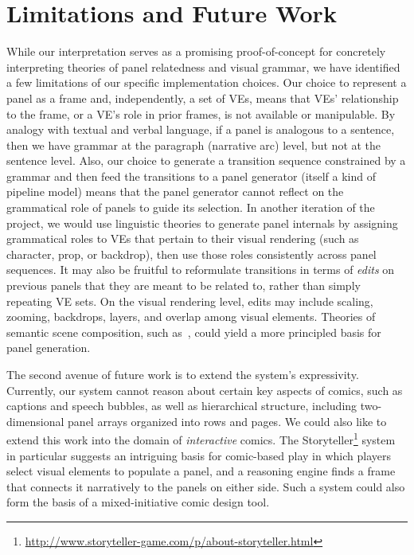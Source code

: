 \section{Limitations and Future Work}

While our interpretation serves as a promising proof-of-concept for
concretely interpreting theories of panel relatedness and visual grammar,
we have identified a few limitations of our specific implementation
choices.  Our choice to represent a panel as a frame and,
independently, a set of VEs, means that VEs' relationship to the frame, or
a VE's role in prior frames, is not available or manipulable.  By analogy
with textual and verbal language, if a panel is analogous to a sentence,
then we have grammar at the paragraph (narrative arc) level, but not at
the sentence level.  Also, our choice to generate a transition sequence
constrained by a grammar and {then} feed the transitions to a panel
generator (itself a kind of pipeline model) means that the panel generator
cannot reflect on the grammatical role of panels to guide its selection.
In another iteration of the project, we would use linguistic theories to
generate panel internals by assigning grammatical roles to VEs that pertain
to their visual rendering (such as character, prop, or backdrop), then use
those roles consistently across panel sequences. It may also be fruitful to
reformulate transitions in terms of {\em edits} on previous panels that
they are meant to be related to, rather than simply repeating VE sets.
On the visual rendering level, edits may include scaling, zooming,
backdrops, layers, and overlap among visual elements.  Theories of semantic
scene composition, such as~\cite{zitnick2013bringing}, could yield a more
principled basis for panel generation.

The second avenue of future work is to extend the system's expressivity.
Currently, our system cannot reason about certain key aspects of
comics, such as captions and speech bubbles, as well as hierarchical structure,
including two-dimensional panel arrays organized into rows and pages.  We
could also like to extend this work into the domain of {\em interactive}
comics. The
Storyteller\footnote{\url{http://www.storyteller-game.com/p/about-storyteller.html}}
system in particular suggests an intriguing basis for comic-based play in
which players select visual elements to populate a panel, and a reasoning
engine finds a frame that connects it narratively to the panels on either
side.  Such a system could also form the basis of a mixed-initiative comic
design tool.


